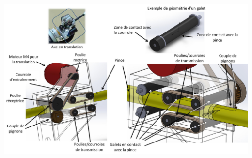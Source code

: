 \documentclass[10pt,fleqn]{article} %
\begin{document}
\begin{center}
\includegraphics[width=\linewidth]{images/fig_04}
\end{center}
\end{document}
